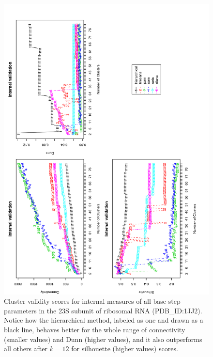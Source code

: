 \begin{figure}
 \centering
\includegraphics[angle=0, scale=0.34]{Chapter2/STval_int.png}
\caption{Cluster  validity   scores  for  internal   measures  of  all
  base-step   parameters  in   the  23S   subunit  of   ribosomal  RNA
  (PDB\_ID:1JJ2). Notice  how the hierarchical method,  labeled as one
  and drawn  as a black  line, behaves better  for the whole  range of
  connectivity (smaller values) and  Dunn (higher values), and it also
  outperforms all  others after $k=12$ for  silhouette (higher values)
  scores.}
 \label{fig:internal}
\end{figure}

